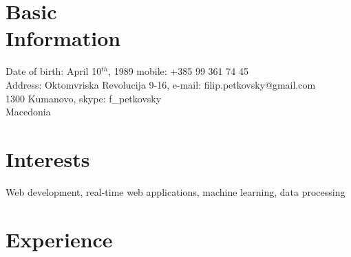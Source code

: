\documentclass[margin,line]{resume}
\begin{document}
\begin{resume}

    \section{\mysidestyle Basic\\Information}

    Date of birth: April 10$^{th}$, 1989                \hfill mobile: +385 99 361 74 45          
    \vspace{0mm}\\
    \vspace{0mm}%
    Address: Oktomvriska Revolucija 9-16,               \hfill e-mail: filip.petkovsky@gmail.com 
    \\
    \vspace{0mm}%
    1300 Kumanovo,                                      \hfill skype: f\_petkovsky  
    \vspace{0mm} \\
    \vspace{0mm}%
    Macedonia 
    \vspace{0mm} \\
    \vspace{0mm}%
              
    \vspace{0mm} 
    
    \section{\mysidestyle Interests}

    Web development, real-time web applications, machine learning, data processing

    

    \section{\mysidestyle Experience} 


\end{resume}
\end{document}
